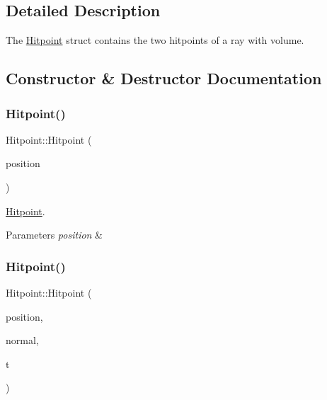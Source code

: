 \subsection{Detailed Description}
The \mbox{\hyperlink{struct_hitpoint}{Hitpoint}} struct contains the two hitpoints of a ray with volume. 

\subsection{Constructor \& Destructor Documentation}
\mbox{\label{struct_hitpoint_a544329fb8b4556202074ff60f941a1cc}} 
\subsubsection{\texorpdfstring{Hitpoint()}{Hitpoint()}\hspace{0.1cm}{\footnotesize\ttfamily [1/2]}}
{\footnotesize\ttfamily Hitpoint\+::\+Hitpoint (\begin{DoxyParamCaption}\item[{const Q\+Vector3D \&}]{position }\end{DoxyParamCaption})}



\mbox{\hyperlink{struct_hitpoint}{Hitpoint}}. 


\begin{DoxyParams}{Parameters}
{\em position} & \\
\hline
\end{DoxyParams}
\mbox{\label{struct_hitpoint_a7f098fb5a60e88c5f0ff5ce1d3161b84}} 
\subsubsection{\texorpdfstring{Hitpoint()}{Hitpoint()}\hspace{0.1cm}{\footnotesize\ttfamily [2/2]}}
{\footnotesize\ttfamily Hitpoint\+::\+Hitpoint (\begin{DoxyParamCaption}\item[{const Q\+Vector3D \&}]{position,  }\item[{const Q\+Vector3D \&}]{normal,  }\item[{double}]{t }\end{DoxyParamCaption})}



